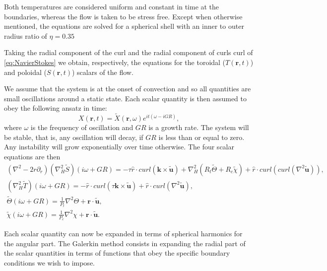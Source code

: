 \documentclass[a4paper,10pt]{book}
\renewcommand{\vec}[1]{\mathbf{#1}}
\begin{document}
Both temperatures are considered uniform and constant in time at the boundaries,
whereas the flow is taken to be stress free. Except when otherwise mentioned,
the equations are solved for a spherical shell with an inner to outer radius
ratio of $\eta=0.35$

Taking the radial component of the curl and the radial component of curls curl of
\ref{eq:NavierStokes} we obtain, respectively, the equations for the toroidal
($T(\vec r,t)$) and poloidal ($S(\vec r,t)$) scalars of the flow.

We assume that the system is at the onset of convection and so all quantities
are small oscillations around a static state. Each scalar quantity is then
assumed to obey the following ansatz in time:
\begin{equation}
 X(\vec r, t) = \tilde X(\vec r,\omega) e^{it(\omega-iGR)},
\end{equation}
where $\omega$ is the frequency of oscillation and $GR$ is a growth rate. The
system will be stable, that is, any oscillation will decay, if $GR$ is less than
or equal to zero. Any instability will grow exponentially over time otherwise.
The four scalar equations are then
\begin{subequations}
\begin{gather}
\label{eq:Poloidal}
(\nabla^2-2r\partial_r)(\nabla^2_{H} \tilde S) (i\omega +GR)= - \tau \hat r \cdot curl (\vec k \times \tilde{\vec u})  + \nabla^2_{H}(R_t \tilde\Theta +R_c \tilde\chi ) + \hat r \cdot curl (curl(\nabla^2 \tilde{\vec u})), \\
\label{eq:Toroidal}
(\nabla^2_{H} \tilde T) (i\omega +GR) = - \hat r \cdot curl (\tau \vec k \times \tilde{\vec u})  + \hat r \cdot curl (\nabla^2 \tilde{\vec u}), \\
\label{eq:temp}
\tilde \Theta (i\omega +GR) = \frac{1}{P_t}\nabla^2 \Theta + \vec r \cdot \tilde{\vec u} , \\
\label{eq:comp}
\tilde \chi  (i\omega +GR) = \frac{1}{P_c}\nabla^2 \chi  + \vec r \cdot \tilde{\vec u} .
\end{gather}
\end{subequations}

Each scalar quantity can now be expanded in terms of spherical harmonics for the
angular part. The Galerkin method consists in expanding the radial part of the
scalar quantities in terms of functions that obey the specific boundary
conditions we wish to impose.
\end{document}
